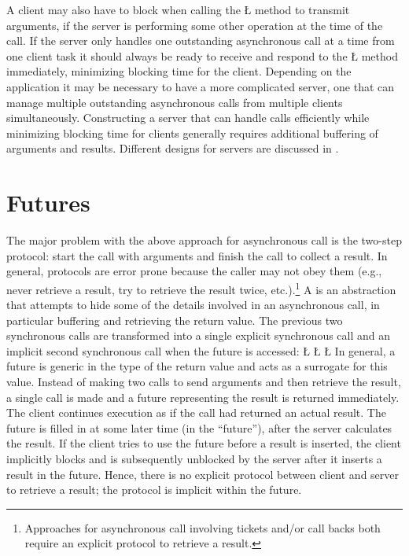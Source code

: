 \documentclass[openright,twoside]{report}
\begin{document}
A client may also have to block when calling the \LGinlinetrue\LGbegin\lgrinde\L{}\endlgrinde\LGend{} method to transmit arguments, if the server is performing some other operation at the time of the call.
If the server only handles one outstanding asynchronous call at a time from one client task it should always be ready to receive and respond to the \LGinlinetrue\LGbegin\lgrinde\L{}\endlgrinde\LGend{} method immediately, minimizing blocking time for the client.
Depending on the application it may be necessary to have a more complicated server, one that can manage multiple outstanding asynchronous calls from multiple clients simultaneously.
Constructing a server that can handle calls efficiently while minimizing blocking time for clients generally requires additional buffering of arguments and results.
Different designs for servers are discussed in .


\section{Futures}
\label{s:Futures}

The major problem with the above approach for asynchronous call is the two-step protocol: start the call with arguments and finish the call to collect a result.
In general, protocols are error prone because the caller may not obey them (e.g., never retrieve a result, try to retrieve the result twice, etc.).\footnote{
Approaches for asynchronous call involving tickets and/or call backs both require an explicit protocol to retrieve a result.}
A  is an abstraction that attempts to hide some of the details involved in an asynchronous call, in particular buffering and retrieving the return value.
The previous two synchronous calls are transformed into a single explicit synchronous call and an implicit second synchronous call when the future is accessed:
\LGinlinefalse\LGbegin\lgrinde
\L{}
\CE{}\L{}
\CE{}\L{}
\CE{}\endlgrinde\LGend
In general, a future is generic in the type of the return value and acts as a surrogate for this value.
Instead of making two calls to send arguments and then retrieve the result, a single call is made and a future representing the result is returned immediately.
The client continues execution as if the call had returned an actual result.
The future is filled in at some later time (in the ``future''), after the server calculates the result.
If the client tries to use the future before a result is inserted, the client implicitly blocks and is subsequently unblocked by the server after it inserts a result in the future.
Hence, there is no explicit protocol between client and server to retrieve a result;
the protocol is implicit within the future.
\end{document}
